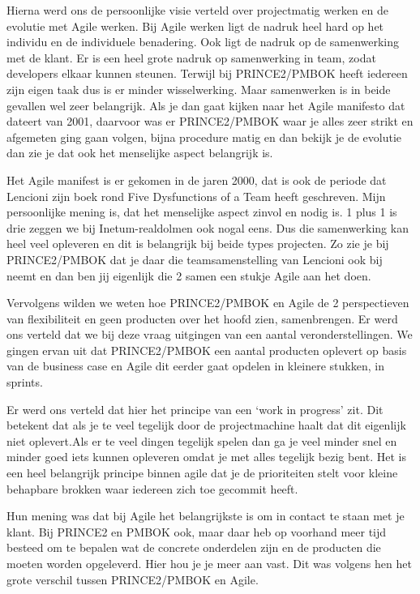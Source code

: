 \documentclass[dutch]{hogent-article}
\begin{document}
Hierna werd ons de persoonlijke visie verteld over projectmatig werken en de evolutie met Agile werken. Bij Agile werken ligt de nadruk heel hard op het individu en de individuele benadering. Ook ligt de nadruk op de samenwerking met de klant. Er is een heel  grote nadruk op samenwerking in team, zodat developers elkaar kunnen steunen. Terwijl bij PRINCE2/PMBOK heeft iedereen zijn eigen taak dus is er minder wisselwerking. Maar samenwerken is in beide gevallen wel zeer belangrijk. Als je dan gaat kijken naar het Agile manifesto dat dateert van 2001, daarvoor was er PRINCE2/PMBOK waar je alles zeer strikt en afgemeten ging gaan volgen, bijna procedure matig en dan bekijk je de evolutie dan zie je dat ook het menselijke aspect belangrijk is. 
\newline

Het Agile manifest is er gekomen in de jaren 2000, dat is ook de periode dat Lencioni zijn boek rond Five Dysfunctions of a Team heeft geschreven. Mijn persoonlijke mening is, dat het menselijke aspect zinvol en nodig is. 1 plus 1 is drie zeggen we bij Inetum-realdolmen ook nogal eens. Dus die samenwerking kan heel veel opleveren en dit is belangrijk bij beide types projecten. Zo zie je bij PRINCE2/PMBOK dat je daar die teamsamenstelling van Lencioni ook bij neemt en dan ben jij eigenlijk die 2 samen een stukje Agile aan het doen. 
\newline

Vervolgens wilden we weten hoe PRINCE2/PMBOK en Agile de 2 perspectieven van flexibiliteit en geen producten over het hoofd zien, samenbrengen. Er werd ons verteld dat we bij deze vraag uitgingen van een aantal veronderstellingen. We gingen ervan uit dat PRINCE2/PMBOK een aantal producten oplevert op basis van de business case en Agile dit eerder gaat opdelen in kleinere stukken, in sprints. 
\newline

Er werd ons verteld dat hier het principe van een ‘work in progress’ zit. Dit betekent dat als je te veel tegelijk door de projectmachine haalt dat dit eigenlijk niet oplevert.Als er te veel dingen tegelijk spelen dan ga je veel minder snel en minder goed iets kunnen opleveren omdat je met alles tegelijk bezig bent. Het is een heel belangrijk principe binnen agile dat je de prioriteiten stelt voor kleine behapbare brokken waar iedereen zich toe gecommit heeft. 
\newline

Hun mening was dat bij Agile het belangrijkste is om in contact te  staan met je klant. Bij PRINCE2 en PMBOK ook, maar daar heb op voorhand meer tijd besteed om te bepalen wat de concrete onderdelen zijn en de producten die moeten worden opgeleverd. Hier hou je je meer aan vast. Dit was volgens hen het grote verschil tussen PRINCE2/PMBOK en Agile. 
\newline
\end{document}
